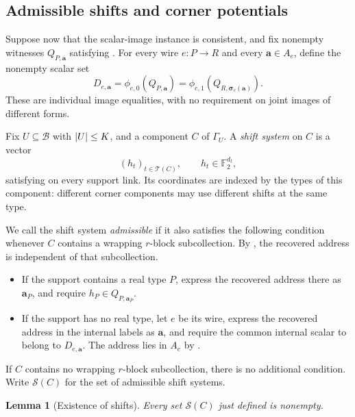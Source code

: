 \documentclass[11pt]{article}
\newtheorem{lemma}[theorem]{Lemma}
\theoremstyle{definition}
\newcommand{\F}{\mathbb F_2}
\newcommand{\cB}{\mathcal B}
\DeclarePairedDelimiter{\abs}{\lvert}{\rvert}
\begin{document}
\subsection{Admissible shifts and corner potentials}
\label{offset:shifts}

Suppose now that the scalar-image instance is consistent, and fix
nonempty witnesses \(Q_{P,\mathbf a}\) satisfying
. For every wire \(e:P\to R\) and every
\(\mathbf a\in A_e\), define the nonempty scalar set
\begin{equation}
 D_{e,\mathbf a}
   =\phi_{e,0}(Q_{P,\mathbf a})
   =\phi_{e,1}
       (Q_{R,\boldsymbol\sigma_e(\mathbf a)}).
 \label{offset:eq-wire-images}
\end{equation}
These are individual image equalities, with no requirement on joint
images of different forms.

Fix \(U\subseteq\cB\) with \(\abs{U}\le K\), and a component \(C\) of
\(\Gamma_U\). A \emph{shift system} on \(C\) is a vector
\[
 (h_t)_{t\in\mathcal T(C)},\qquad h_t\in\F^{d_t},
\]
satisfying  on every support link. Its coordinates
are indexed by the types of this component: different corner components
may use different shifts at the same type.

We call the shift system \emph{admissible} if it also satisfies the
following condition whenever \(C\) contains a wrapping \(r\)-block
subcollection. By , the recovered address is
independent of that subcollection.
\begin{itemize}
 \item If the support contains a real type \(P\), express the recovered
 address there as \(\mathbf a_P\), and require
 \(h_P\in Q_{P,\mathbf a_P}\).
 \item If the support has no real type, let \(e\) be its wire, express the
 recovered address in the internal labels as \(\mathbf a\), and require
 the common internal scalar to belong to \(D_{e,\mathbf a}\).
 The address lies in \(A_e\) by .
\end{itemize}
If \(C\) contains no wrapping \(r\)-block subcollection, there is no
additional condition. Write \(\mathcal S(C)\) for the set of admissible
shift systems.

\begin{lemma}[Existence of shifts]
\label{offset:lem-shifts-exist}
Every set \(\mathcal S(C)\) just defined is nonempty.
\end{lemma}
\end{document}
